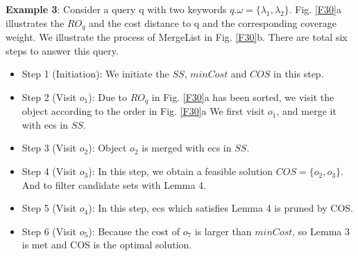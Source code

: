 \textbf{Example 3}: Consider a query q with two keywords $q.\omega=\{\lambda_1, \lambda_2\}$. Fig. \ref{F30}a illustrates the $RO_q$ and the cost distance to q and the corresponding coverage weight. We illustrate the process of MergeList in Fig. \ref{F30}b. There are total six steps to answer this query.
\begin{itemize}
    \item Step 1 (Initiation): We initiate the $SS$, $minCost$ and $COS$ in this step.
    \item Step 2 (Visit $o_1$): Due to $RO_q$ in Fig. \ref{F30}a has been sorted, we visit the object according to the order in Fig. \ref{F30}a We first visit $o_1$, and merge it with ecs in $SS$.
    \item Step 3 (Visit $o_2$): Object $o_2$ is merged with ecs in $SS$.
    \item Step 4 (Visit $o_3$): In this step, we obtain a feasible solution $COS=\{o_2,o_3\}$. And to filter candidate sets with Lemma 4.
    \item Step 5 (Visit $o_4$): In this step, ecs which satisfies Lemma 4 is pruned by COS.
    \item Step 6 (Visit $o_5$): Because the cost of $o_7$ is larger than $minCost$, so Lemma 3 is met and COS is the optimal solution.
\end{itemize}


